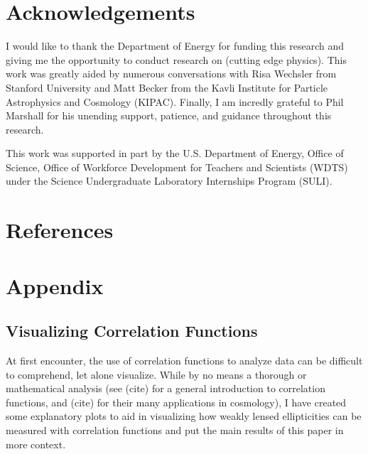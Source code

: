 \documentclass[%
 reprint,
 amsmath,amssymb,
 aps,nofootinbib
]{revtex4-1}
\begin{document}
\section{Acknowledgements}

I would like to thank the Department of Energy for funding this research and giving me the opportunity to conduct research on (cutting edge physics). This work was greatly aided by numerous conversations with Risa Wechsler from Stanford University and Matt Becker from the Kavli Institute for Particle Astrophysics and Cosmology (KIPAC). Finally, I am incredly grateful to Phil Marshall for his unending support, patience, and guidance throughout this research.

This work was supported in part by the U.S. Department of Energy, Office of Science, Office of Workforce Development for Teachers and Scientists (WDTS) under the Science Undergraduate Laboratory Internships Program (SULI).

\onecolumngrid

\section{References}





\section{Appendix}

\subsection{Visualizing Correlation Functions}

At first encounter, the use of correlation functions to analyze data can be difficult to comprehend, let alone visualize. While by no means a thorough or mathematical analysis (see (cite) for a general introduction to correlation functions, and (cite) for their many applications in cosmology), I have created some explanatory plots to aid in visualizing how weakly lensed ellipticities can be measured with correlation functions and put the main results of this paper in more context.
\end{document}
